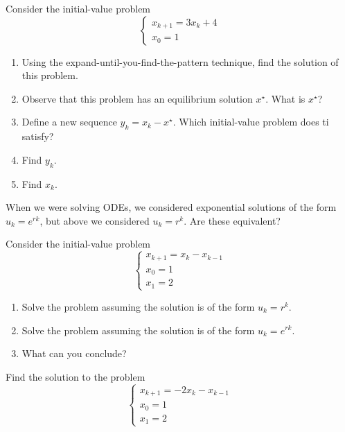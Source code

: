 \begin{exercises}

	\begin{problist}
	\prob Consider the initial-value problem
	$$ 	\begin{cases}
			 x_{k+1} = 3 x_k + 4 \\
			 x_0 = 1
 		\end{cases} $$
 	\begin{enumerate}
 		\item Using the expand-until-you-find-the-pattern technique, find the solution of this problem.
 		\item Observe that this problem has an equilibrium solution $x^\star$. What is $x^\star$?
 		\item Define a new sequence $y_k = x_k - x^\star$. Which initial-value problem does ti satisfy?
 		\item Find $y_k$.
 		\item Find $x_k$.
 	\end{enumerate}

	\prob When we were solving ODEs, we considered exponential solutions of the form $u_k = e^{rk}$, but above we considered $u_k = r^k$. Are these equivalent?
	
	Consider the initial-value problem
	$$ 	\begin{cases}
			 x_{k+1} = x_{k} - x_{k-1} \\
			 x_0 = 1 \\
			 x_1 = 2
 		\end{cases} $$

	\begin{enumerate}
		\item Solve the problem assuming the solution is of the form $u_k = r^k$.
		\item Solve the problem assuming the solution is of the form $u_k=e^{rk}$.
		\item What can you conclude?
	\end{enumerate}

	\prob Find the solution to the problem
	$$ 	\begin{cases}
			 x_{k+1} = -2x_{k} - x_{k-1} \\
			 x_0 = 1 \\
			 x_1 = 2
 		\end{cases} $$
	
	\end{problist}
\end{exercises}
